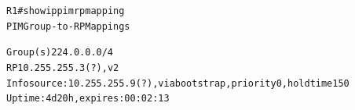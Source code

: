 \documentclass[12pt,twoside,a4paper]{report}
\begin{document}
\noindent
{\selectfont
\begin{small}
\begin{alltt}

R1#show ip pim rp mapping
PIM Group-to-RP Mappings

Group(s) 224.0.0.0/4
  RP 10.255.255.3 (?), v2
    Info source: 10.255.255.9 (?), via bootstrap, priority 0, holdtime 150
         Uptime: 4d20h, expires: 00:02:13

\end{alltt}
\end{small}
}
\end{document}
